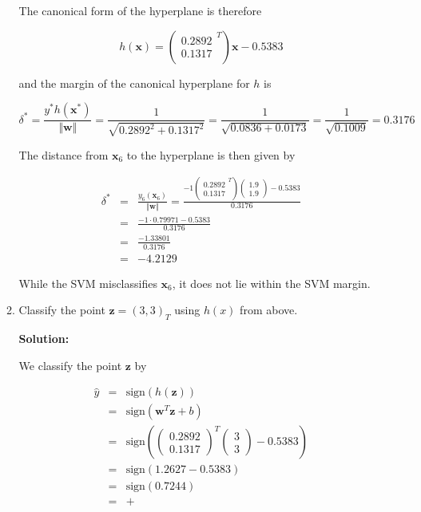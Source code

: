 \documentclass[11pt]{article}
\begin{document}
\begin{enumerate}
\begin{enumerate}
The canonical form of the hyperplane is therefore

\begin{equation*}
h(\mathbf{x}) = 
\left(
\begin{array}{c}
0.2892 \\ 0.1317
\end{array}^\mathit{T}
\right)
\mathbf{x} - 0.5383
\end{equation*}

and the margin of the canonical hyperplane for $h$ is

\begin{equation*}
\delta^*
=
\frac{y^*h(\mathbf{x}^*)}{\Vert \mathbf{w} \Vert}
=
\frac{1}{\sqrt{0.2892^2 + 0.1317^2}}
=
\frac{1}{\sqrt{0.0836 + 0.0173}}
=
\frac{1}{\sqrt{0.1009}}
=
0.3176
\end{equation*}

The distance from $\mathbf{x}_6$ to the hyperplane is then given by

\begin{eqnarray*}
\delta^*
&=&
\frac{y_6(\mathbf{x}_6)}{\Vert \mathbf{w} \Vert}
=
\frac{
-1
\left(
\begin{array}{c}
0.2892 \\ 0.1317
\end{array}^\mathit{T}
\right)
\left(
\begin{array}{c}
1.9 \\ 1.9
\end{array}
\right) - 0.5383
}{0.3176} \\
&=& \frac{-1 \cdot 0.79971 - 0.5383}{0.3176} \\
&=& \frac{-1.33801}{0.3176} \\
&=& -4.2129
\end{eqnarray*}

While the SVM misclassifies $\mathbf{x}_6$, it does not lie within the SVM margin.

\item Classify the point $\mathbf{z} = (3, 3)_\mathit{T}$ using $h(x)$ from above.

\textbf{Solution:}

We classify the point $\mathbf{z}$ by

\begin{eqnarray*}
\hat{y} &=& \text{sign}(h(\mathbf{z})) \\
&=& \text{sign}( \mathbf{w}^\mathit{T} \mathbf{z} + b ) \\
&=& \text{sign}\left( \left( \begin{array}{c} 0.2892 \\ 0.1317 \end{array} \right)^\mathit{T} \left( \begin{array}{c} 3 \\ 3 \end{array} \right) - 0.5383 \right) \\
&=& \text{sign}(1.2627 - 0.5383) \\
&=& \text{sign}(0.7244) \\
&=& +
\end{eqnarray*}


\end{enumerate}
\end{enumerate}
\end{document}
